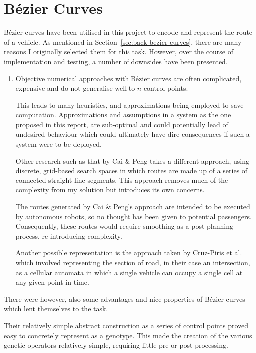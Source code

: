 \section{Bézier Curves}
\label{sec:eval:bezier}

Bézier curves have been utilised in this project to encode and represent the route of a vehicle. As mentioned in Section~\ref{sec:back-bezier-curves}, there are many reasons I originally selected them for this task. However, over the course of implementation and testing, a number of downsides have been presented.

\begin{enumerate}
  \item Objective numerical approaches with Bézier curves are often complicated, expensive and do not generalise well to $n$ control points.

        This leads to many heuristics, and approximations being employed to save computation. Approximations and assumptions in a system as the one proposed in this report, are sub-optimal and could potentially lead of undesired behaviour which could ultimately have dire consequences if such a system were to be deployed.

        Other research such as that by Cai \& Peng\cite{caiCooperativeCoevolutionaryAdaptive2002} takes a different approach, using discrete, grid-based search spaces in which routes are made up of a series of connected straight line segments. This approach removes much of the complexity from my solution but introduces its own concerns.

        The routes generated by Cai \& Peng's approach are intended to be executed by autonomous robots, so no thought has been given to potential passengers. Consequently, these routes would require smoothing as a post-planning process, re-introducing complexity.

        Another possible representation is the approach taken by Cruz-Piris et al.\cite{cruz-pirisAutomatedOptimizationIntersections2019} which involved representing the section of road, in their case an intersection, as a cellular automata in which a single vehicle can occupy a single cell at any given point in time. \end{enumerate}


There were however, also some advantages and nice properties of Bézier curves which lent themselves to the task.

Their relatively simple abstract construction as a series of control points proved easy to concretely represent as a genotype. This made the creation of the various genetic operators relatively simple, requiring little pre or post-processing.

